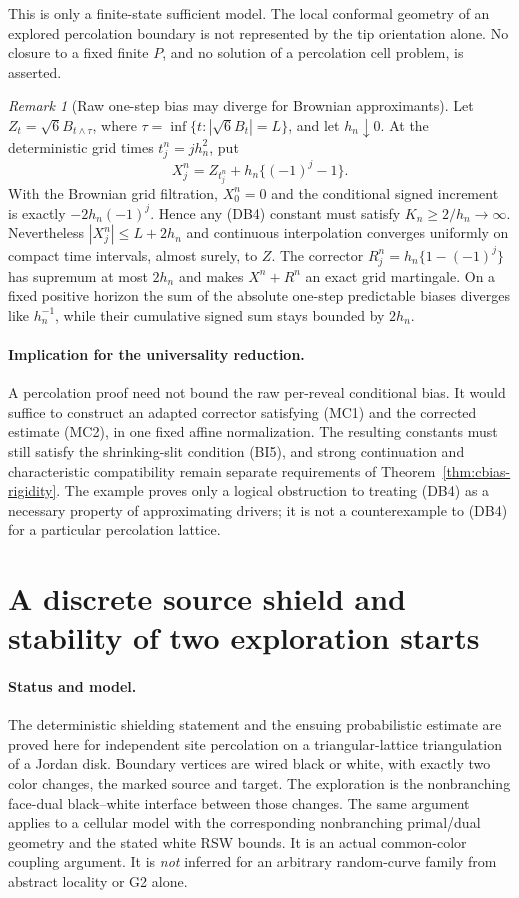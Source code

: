 \documentclass[11pt]{article}
\theoremstyle{definition}\newtheorem{definition}[theorem]{Definition}
\theoremstyle{remark}\newtheorem{remark}[theorem]{Remark}
\begin{document}
This is only a finite-state sufficient model. The local conformal
geometry of an explored percolation boundary is not represented by the
tip orientation alone. No closure to a fixed finite $P$, and no solution
of a percolation cell problem, is asserted.

\begin{remark}[Raw one-step bias may diverge for Brownian approximants]
\label{ex:oscillatory-bias}
Let $Z_t=\sqrt6 B_{t\wedge\tau}$, where
$\tau=\inf\{t:|\sqrt6 B_t|=L\}$, and let $h_n\downarrow0$.
At the deterministic grid times $t_j^n=jh_n^2$, put
\[
 X^n_j=Z_{t^n_j}+h_n\{(-1)^j-1\}.
 \tag{MC5}
\]
With the Brownian grid filtration, $X^n_0=0$ and the conditional signed
increment is exactly $-2h_n(-1)^j$. Hence any (DB4) constant must satisfy
$K_n\ge2/h_n\to\infty$. Nevertheless $|X^n_j|\le L+2h_n$ and
continuous interpolation converges uniformly on compact time intervals,
almost surely, to $Z$. The corrector
$R^n_j=h_n\{1-(-1)^j\}$ has supremum at most $2h_n$ and makes
$X^n+R^n$ an exact grid martingale. On a fixed positive horizon the sum
of the absolute one-step predictable biases diverges like $h_n^{-1}$,
while their cumulative signed sum stays bounded by $2h_n$.
\end{remark}

\paragraph{Implication for the universality reduction.}
A percolation proof need not bound the raw per-reveal conditional bias.
It would suffice to construct an adapted corrector satisfying (MC1)
and the corrected estimate (MC2), in one fixed affine normalization.
The resulting constants must still satisfy the shrinking-slit condition
(BI5), and strong continuation and characteristic compatibility remain
separate requirements of Theorem~\ref{thm:cbias-rigidity}.
The example proves only a logical obstruction to treating (DB4) as a
necessary property of approximating drivers; it is not a counterexample
to (DB4) for a particular percolation lattice.


\section{A discrete source shield and stability of two exploration starts}
\label{sec:source-shield}

\paragraph{Status and model.}
The deterministic shielding statement and the ensuing probabilistic estimate
are proved here for independent site percolation on a triangular-lattice
triangulation of a Jordan disk. Boundary vertices are wired black or white,
with exactly two color changes, the marked source and target. The exploration
is the nonbranching face-dual black--white interface between those changes.
The same argument applies to a cellular model with the corresponding
nonbranching primal/dual geometry and the stated white RSW bounds.
It is an actual common-color coupling argument. It is \emph{not} inferred
for an arbitrary random-curve family from abstract locality or G2 alone.
\end{document}
